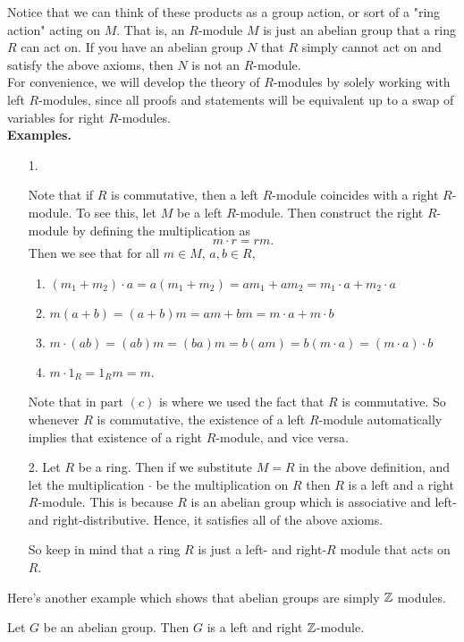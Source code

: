 Notice that we can think of these products as a group action, or sort of a
"ring action" acting on $M$. That is, an $R$-module $M$ is just an abelian
group that a ring $R$ can act on. If you have an abelian group $N$
that $R$ simply cannot act on and satisfy the above axioms, then
$N$ is not an $R$-module.
\\
For convenience, we will develop the theory of $R$-modules by
solely working with left $R$-modules, since all proofs and
statements will be equivalent up to a swap of variables for right
$R$-modules. 
\\
\textbf{Examples.}\\
\begin{itemize}
    \item[1.] \textcolor{NavyBlue}{Note that if $R$ is commutative, then a left
    $R$-module coincides with a right $R$-module. To see this, let $M$
    be a left $R$-module. Then construct the right $R$-module by
    defining the multiplication as
    \[
        m\cdot r = rm.
    \]
    Then we see that for all $m \in M$, $a,b \in R$, 
    \begin{enumerate}
        \item $(m_1 + m_2)\cdot a = a(m_1 + m_2) = am_1 + am_2 = m_1
        \cdot a + m_2 \cdot a$ \checkmark
        \item $m(a + b)= (a + b)m = am + bm = m \cdot a + m
        \cdot b$ \checkmark 
        \item $m\cdot (a b) = (ab)m = (ba)m = b(am) = b(m \cdot a) = (m
        \cdot a )\cdot b$ \checkmark 
        \item $m \cdot 1_R = 1_Rm = m$. \checkmark
    \end{enumerate}
    Note that in part $(c)$ is where we used the fact that $R$ is
    commutative. So whenever $R$ is commutative, the existence of a
    left $R$-module automatically implies that existence of a
    right $R$-module, and vice versa.
    }

    \item[2.] Let $R$ be a ring. Then if we substitute $M =R$ in the above
    definition, and let the multiplication $
    \cdot$ be the multiplication on $R$ then $R$ is a left and a right
    $R$-module. This is because $R$ is an abelian group which is
    associative and left- and right-distributive. Hence, it satisfies
    all of the above axioms. 

    So keep in mind that a ring $R$ is just a left- and right-$R$
    module that acts on $R$. 

\end{itemize}
Here's another example which shows that abelian groups are simply
$\mathbb{Z}$ modules. 
\begin{proposition}
    Let $G$ be an abelian group. Then $G$ is a left and right
    $\mathbb{Z}$-module. 
\end{proposition}

